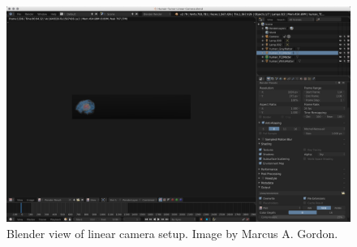 \begin{figure}[H]
  \centering
  \includegraphics[width=\linewidth]{img/linCam1.png}
  \caption{Blender view of linear camera setup. Image by Marcus A. Gordon.}
\end{figure}

